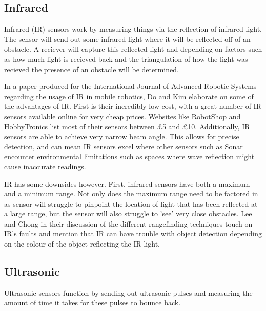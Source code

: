 				\subsection{Infrared}
				\label{litreview:infrared}
				Infrared (IR) sensors work by measuring things via the reflection of infrared light. The sensor will send out some infrared light where it will be reflected off of an obstacle. A reciever will capture this reflected light and depending on factors such as how much light is recieved back and the triangulation of how the light was recieved the presence of an obstacle will be determined. 
				
				In a paper produced for the International Journal of Advanced Robotic Systems regarding the usage of IR in mobile robotics, Do and Kim\citep{do2013infrared} elaborate on some of the advantages of IR. First is their incredibly low cost, with a great number of IR sensors available online for very cheap prices. Websites like RobotShop and HobbyTronics list most of their sensors between \pounds{5} and \pounds{10}. Additionally, IR sensors are able to achieve very narrow beam angle. This allows for precise detection, and can mean IR sensors excel where other sensors such as Sonar encounter environmental limitations such as spaces where wave reflection might cause inaccurate readings. 
				
				IR has some downsides however. First, infrared sensors have both a maximum and a minimum range. Not only does the maximum range need to be factored in as sensor will struggle to pinpoint the location of light that has been reflected at a large range, but the sensor will also struggle to 'see' very close obstacles. Lee and Chong \cite{lee2011low} in their discussion of the different rangefinding techniques touch on IR's faults and mention that IR can have trouble with object detection depending on the colour of the object reflecting the IR light.
				
				
				\subsection{Ultrasonic}
				\label{litreview:ultrasonic}
				Ultrasonic sensors function by sending out ultrasonic pulses and measuring the amount of time it takes for these pulses to bounce back. 
				

